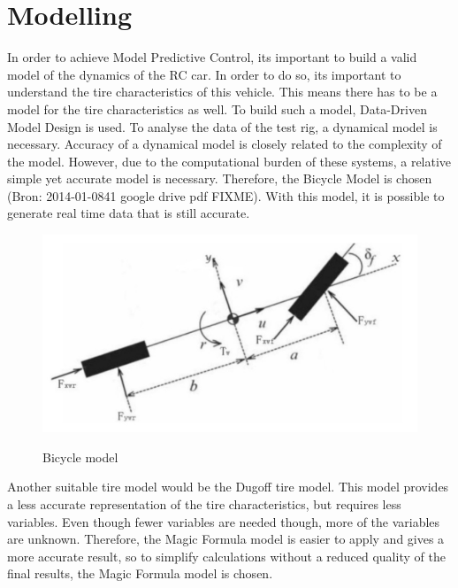 \section{Modelling}
In order to achieve Model Predictive Control, it\textquotesingle s important to build a valid model of the dynamics of the RC car. In order to do so, it\textquotesingle  s important to understand the tire characteristics of this vehicle. This means there has to be a model for the tire characteristics as well. To build such a model, Data-Driven Model Design is used. 
To analyse the data of the test rig, a dynamical model is necessary. Accuracy of a dynamical model is closely related to the complexity of the model. However, due to the computational burden of these systems, a relative simple yet accurate model is necessary. Therefore, the Bicycle Model is chosen (Bron: 2014-01-0841 google drive pdf FIXME). With this model, it is possible to generate real time data that is still accurate. 

\begin{figure}
	\centering
		\includegraphics[scale=0.5]{figure/bicyclemodel.jpg}
	\label{fig:bicyclemodel}
	\caption{Bicycle model}
\end{figure}
Another suitable tire model would be the Dugoff tire model. This model provides a less accurate representation of the tire characteristics, but requires less variables. Even though fewer variables are needed though, more of the variables are unknown. Therefore, the Magic Formula model is easier to apply and gives a more accurate result, so to simplify calculations without a reduced quality of the final results, the Magic Formula model is chosen. 

